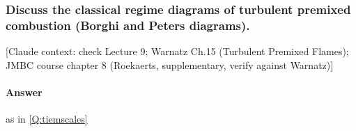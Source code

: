 \subsubsection{Discuss the classical regime diagrams of turbulent premixed combustion (Borghi and Peters diagrams).}

{\color{gray}\footnotesize [Claude context: check Lecture 9; Warnatz Ch.15 (Turbulent Premixed Flames); JMBC course chapter 8 (Roekaerts, supplementary, verify against Warnatz)]}

\label{Q: models peters}

\paragraph{Answer}

as in \ref{Q:tiemscales}




